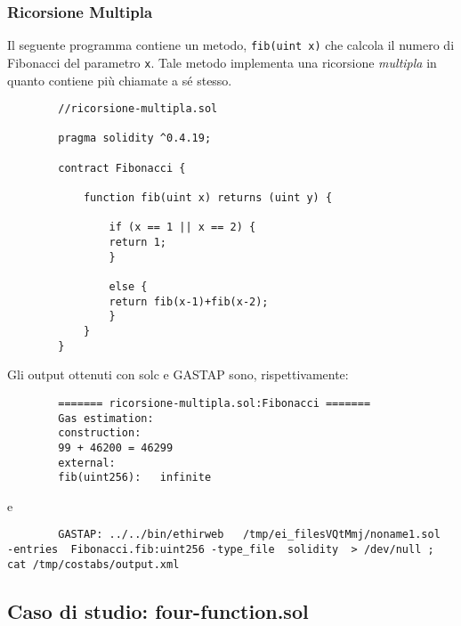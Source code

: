         \subsubsection{Ricorsione Multipla}
        
        Il seguente programma contiene un metodo, \verb|fib(uint x)| che calcola il numero di Fibonacci del parametro \verb|x|. Tale metodo implementa una ricorsione \emph{multipla} in quanto contiene più chiamate a sé stesso.\newline
        
        \begin{minipage}{\linewidth}
        \begin{lstlisting}
        //ricorsione-multipla.sol

        pragma solidity ^0.4.19;

        contract Fibonacci {

            function fib(uint x) returns (uint y) {
            
                if (x == 1 || x == 2) {
                return 1;
                }
                
                else {
                return fib(x-1)+fib(x-2);
                }
            }
        }
        \end{lstlisting}
        \end{minipage}
        
        Gli output ottenuti con solc e GASTAP sono, rispettivamente:
        
        \begin{minipage}{\linewidth}
        \begin{lstlisting}
        ======= ricorsione-multipla.sol:Fibonacci =======
        Gas estimation:
        construction:
        99 + 46200 = 46299
        external:
        fib(uint256):	infinite
        \end{lstlisting}
        \end{minipage}

        e
    
        \begin{lstlisting}
        GASTAP: ../../bin/ethirweb   /tmp/ei_filesVQtMmj/noname1.sol  -entries  Fibonacci.fib:uint256 -type_file  solidity  > /dev/null ; cat /tmp/costabs/output.xml         
        \end{lstlisting}
        
     
    \newpage
     
    \subsection{Caso di studio: four-function.sol}
    
